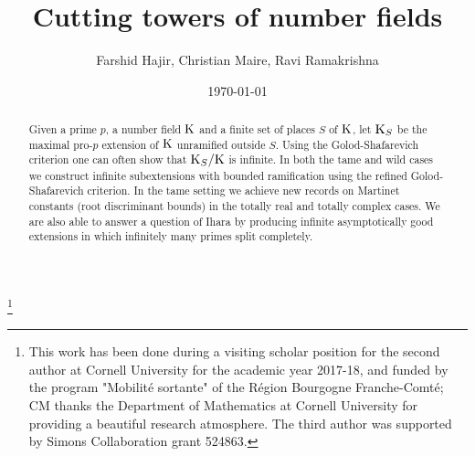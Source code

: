 \documentclass[12pt,a4paper,twoside,english]{smfart}
\def\K{{\rm K}}
\begin{document}
\date{\today}

\title{Cutting  towers of number fields}
\author{Farshid Hajir, Christian Maire, Ravi Ramakrishna}
\address{Department of Mathematics, University of Massachussetts, Amherst, MA 01003, USA}
 \address{FEMTO-ST Institute, 15B avenue des Montboucons, 25000 Besancon, FRANCE} 
\address{Department of Mathematics, Cornell University, Ithaca, USA}

\thanks{This work has been done during a visiting scholar position for the second author at Cornell University for  the academic year 2017-18, and funded by the program "Mobilit\'e sortante" of the R\'egion Bourgogne Franche-Comt\'e;  CM thanks the  Department of Mathematics at Cornell University for providing a beautiful research atmosphere.
The third author was supported by Simons Collaboration grant 524863.}



\begin{abstract} Given a prime $p$, a number field $\K$ and a finite set of places $S$ of $\K$,
let $\K_S$ be the maximal pro-$p$ extension of $\K$ unramified outside $S$. Using the Golod-Shafarevich criterion one can
often show that $\K_S/\K$ is infinite. In both the tame and wild cases we construct infinite subextensions with bounded ramification using the refined Golod-Shafarevich criterion. In
 the tame setting we achieve new records on Martinet constants (root discriminant bounds) in the totally real and totally complex cases. 
 We
are also able to answer a question of Ihara by producing infinite asymptotically good extensions in which infinitely many primes split completely.
\end{abstract}

\maketitle


\tableofcontents

\end{document}
